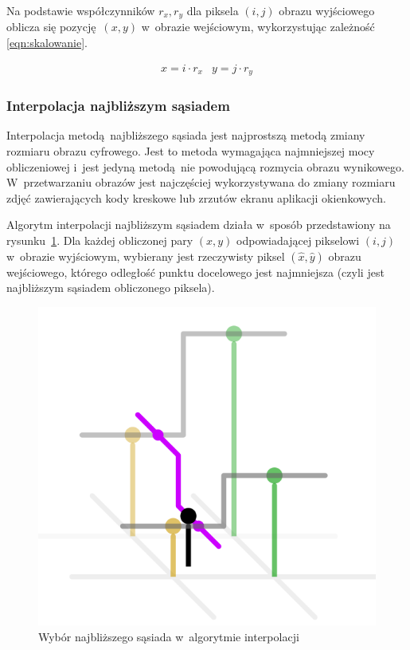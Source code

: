 Na podstawie współczynników $r_{x}, r_{y}$ dla piksela $(i, j)$ obrazu wyjściowego oblicza się pozycję~$(x, y)$ w~obrazie wejściowym, wykorzystując zależność \ref{eqn:skalowanie}.

\begin{equation}
    \label{eqn:skalowanie}
    \begin{array}{ll}
        x = i \cdot r_{x} & y = j \cdot r_{y}
    \end{array} 
\end{equation}

\subsubsection{Interpolacja najbliższym sąsiadem}
Interpolacja metodą najbliższego sąsiada jest najprostszą metodą zmiany rozmiaru obrazu cyfrowego. Jest to metoda wymagająca najmniejszej mocy obliczeniowej i~jest jedyną metodą nie powodującą rozmycia obrazu wynikowego. W~przetwarzaniu obrazów jest najczęściej wykorzystywana do zmiany rozmiaru zdjęć zawierających kody kreskowe lub zrzutów ekranu aplikacji okienkowych.

Algorytm interpolacji najbliższym sąsiadem działa w~sposób przedstawiony na rysunku~\ref{fig:nn-example}. Dla każdej obliczonej pary $(x,y)$ odpowiadającej pikselowi $(i, j)$ w~obrazie wyjściowym, wybierany jest rzeczywisty piksel $(\hat{x}, \hat{y})$ obrazu wejściowego, którego odległość punktu docelowego jest najmniejsza (czyli jest najbliższym sąsiadem obliczonego piksela).

\begin{figure}[h]
    \centering
    \includegraphics[width=0.6\columnwidth]{figures/nearestneighbour.png}
    \caption{Wybór najbliższego sąsiada w~algorytmie interpolacji~\cite{WikipediaEN:bicubicimg}}
    \label{fig:nn-example}
\end{figure}

